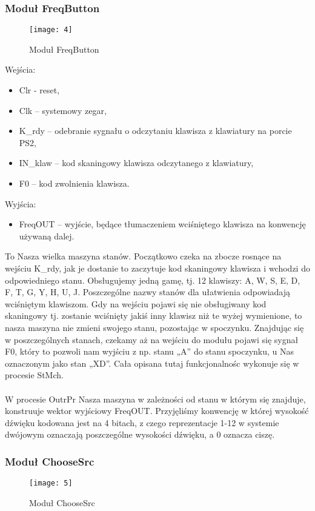 \documentclass[11pt]{article}
\begin{document}
	\subsubsection{Moduł FreqButton}
	
	\begin{figure}[h]
		\centering
		\texttt{[image: 4]}
		\caption{Moduł FreqButton}
		\label{fig:4}
	\end{figure}
	

	Wejścia:
	\begin{itemize}[noitemsep]
	\item Clr - reset,
	\item Clk – systemowy zegar,
	\item K\_rdy – odebranie sygnału o odczytaniu klawisza z klawiatury na porcie PS2,
	\item IN\_klaw – kod skaningowy klawisza odczytanego z klawiatury,
	\item F0 – kod zwolnienia klawisza.
	\end{itemize}
	Wyjścia:
	\begin{itemize}[noitemsep]
		\item FreqOUT – wyjście, będące tłumaczeniem wciśniętego klawisza na konwencję używaną dalej.
	\end{itemize}
	
	To Nasza wielka maszyna stanów. Początkowo czeka na zbocze rosnące na wejściu K\_rdy, jak je dostanie to zaczytuje kod skaningowy klawisza i wchodzi do odpowiedniego stanu. Obsługujemy jedną gamę, tj. 12 klawiszy: A, W, S, E, D, F, T, G, Y, H, U, J. Poszczególne nazwy stanów dla ułatwienia odpowiadają wciśniętym klawiszom. Gdy na wejściu pojawi się nie obsługiwany kod skaningowy tj. zostanie wciśnięty jakiś inny klawisz niż te wyżej wymienione, to nasza maszyna nie zmieni swojego stanu, pozostając w spoczynku. Znajdując się w poszczególnych stanach, czekamy aż na wejściu do modułu pojawi się sygnał F0, który to pozwoli nam wyjściu z np. stanu „A” do stanu spoczynku, u Nas oznaczonym jako stan „XD”. Cała opisana tutaj funkcjonalnośc wykonuje się w procesie StMch.\\\\W procesie OutrPr Nasza maszyna w zależności od stanu w którym się znajduje, konstruuje wektor wyjściowy FreqOUT. Przyjęliśmy konwencję w której wysokość dźwięku kodowana jest na 4 bitach, z czego reprezentacje 1-12 w systemie dwójowym oznaczają poszczególne wysokości dźwięku, a 0 oznacza ciszę.
	
	\subsubsection{Moduł ChooseSrc}
	\begin{figure}[h]
		\centering
		\texttt{[image: 5]}
		\caption{Moduł ChooseSrc}
		\label{fig:5}
	\end{figure}
	
\end{document}
